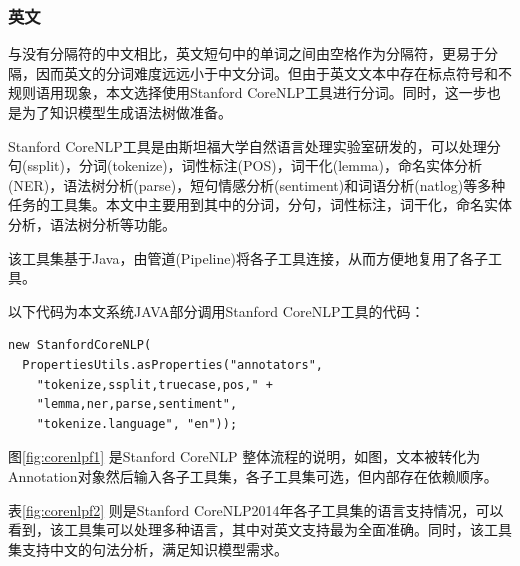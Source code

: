 \subsubsection{英文}
与没有分隔符的中文相比，英文短句中的单词之间由空格作为分隔符，更易于分隔，因而英文的分词难度远远小于中文分词。但由于英文文本中存在标点符号和不规则语用现象，本文选择使用Stanford CoreNLP工具进行分词。同时，这一步也是为了知识模型生成语法树做准备。\par
Stanford CoreNLP工具是由斯坦福大学自然语言处理实验室研发的\cite{corenlp}，可以处理分句(ssplit)，分词(tokenize)，词性标注(POS)，词干化(lemma)，命名实体分析(NER)，语法树分析(parse)，短句情感分析(sentiment)和词语分析(natlog)等多种任务的工具集。本文中主要用到其中的分词，分句，词性标注，词干化，命名实体分析，语法树分析等功能。\par
该工具集基于Java，由管道(Pipeline)将各子工具连接，从而方便地复用了各子工具。\par
以下代码为本文系统JAVA部分调用Stanford CoreNLP工具的代码：\par
\lstset{language=java}
\begin{lstlisting}
new StanfordCoreNLP(
  PropertiesUtils.asProperties("annotators",
    "tokenize,ssplit,truecase,pos," + 
    "lemma,ner,parse,sentiment",
    "tokenize.language", "en"));
\end{lstlisting}

图\ref{fig:corenlpf1} \cite{corenlp} 是Stanford CoreNLP 整体流程的说明，如图，文本被转化为Annotation对象然后输入各子工具集，各子工具集可选，但内部存在依赖顺序。\par
表\ref{fig:corenlpf2} \cite{corenlp} 则是Stanford CoreNLP2014年各子工具集的语言支持情况，可以看到，该工具集可以处理多种语言，其中对英文支持最为全面准确。同时，该工具集支持中文的句法分析，满足知识模型需求。
\begin{center}
\begin{figure}
\end{figure}
\end{center}

